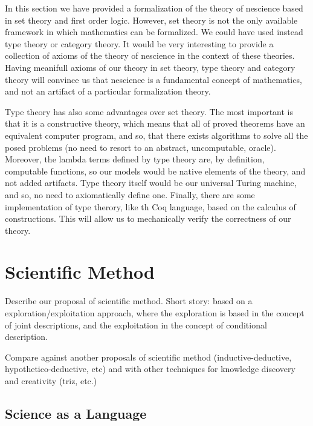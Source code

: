 \begin{remark}
In this section we have provided a formalization of the theory of nescience based in set theory and first order logic. However, set theory is not the only available framework in which mathematics can be formalized. We could have used instead type theory or category theory. It would be very interesting to provide a collection of axioms of the theory of nescience in the context of these theories. Having meanifull axioms of our theory in set theory, type theory and category theory will convince us that nescience is a fundamental concept of mathematics, and not an artifact of a particular formalization theory.

Type theory has also some advantages over set theory. The most important is that it is a constructive theory, which means that all of proved theorems have an equivalent computer program, and so, that there exists algorithms to solve all the posed problems (no need to resort to an abstract, uncomputable, oracle). Moreover, the lambda terms defined by type theory are, by definition, computable functions, so our models would be native elements of the theory, and not added artifacts. Type theory itself would be our universal Turing machine, and so, no need to axiomatically define one. Finally, there are some implementation of type therory, like th Coq language, based on the calculus of constructions. This will allow us to mechanically verify the correctness of our theory.
\end{remark}

%
%

\section{Scientific Method}

{\color{red} Describe our proposal of scientific method. Short story: based on a exploration/exploitation approach, where the exploration is based in the concept of joint descriptions, and the exploitation in the concept of conditional description.}

{\color{red} Compare against another proposals of scientific method (inductive-deductive, hypothetico-deductive, etc) and with other techniques for knowledge discovery and creativity (triz, etc.)}

\subsection{Science as a Language}

